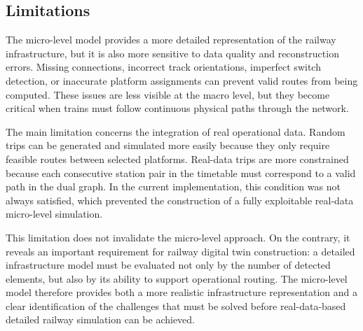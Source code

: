 \subsection{Limitations}
The micro-level model provides a more detailed representation of the railway infrastructure, but it is also more sensitive 
to data quality and reconstruction errors. Missing connections, incorrect track orientations, imperfect switch detection, 
or inaccurate platform assignments can prevent valid routes from being computed. These issues are less visible at the 
macro level, but they become critical when trains must follow continuous physical paths through the network.

The main limitation concerns the integration of real operational data. Random trips can be generated and simulated more 
easily because they only require feasible routes between selected platforms. Real-data trips are more constrained because 
each consecutive station pair in the timetable must correspond to a valid path in the dual graph. In the current 
implementation, this condition was not always satisfied, which prevented the construction of a fully exploitable 
real-data micro-level simulation.

This limitation does not invalidate the micro-level approach. On the contrary, it reveals an important requirement for 
railway digital twin construction: a detailed infrastructure model must be evaluated not only by the number of detected 
elements, but also by its ability to support operational routing. The micro-level model therefore provides both a more 
realistic infrastructure representation and a clear identification of the challenges that must be solved before 
real-data-based detailed railway simulation can be achieved.